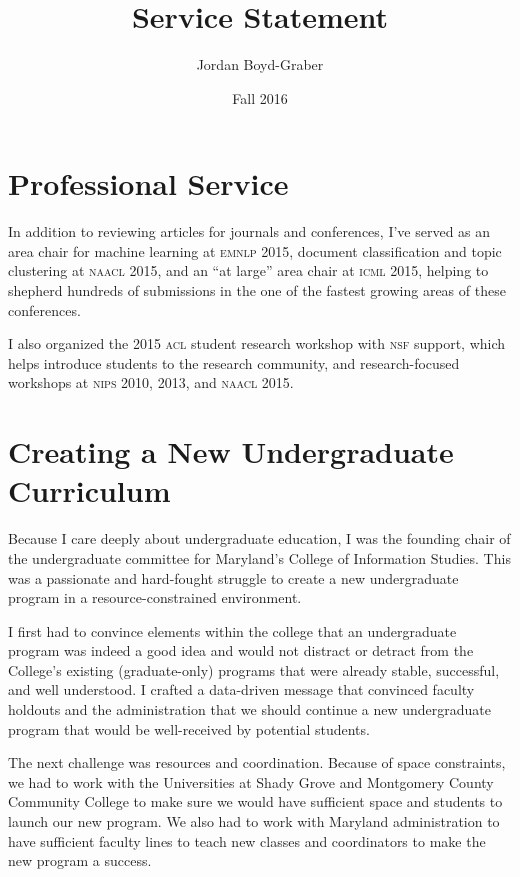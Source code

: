 \documentclass[11pt]{amsart}
\newcommand{\abr}[1]{\textsc{#1}}
\begin{document}
 \title{Service Statement}

 \author{Jordan Boyd-Graber}
\address{University of Colorado}

\date{Fall 2016}


\keywords{}

\maketitle

\section{Professional Service}

In addition to reviewing articles for journals and conferences, I've
served as an area chair for machine learning at \abr{emnlp} 2015,
document classification and topic clustering at \abr{naacl} 2015, and
an ``at large'' area chair at \abr{icml} 2015, helping to shepherd
hundreds of submissions in the one of the fastest growing areas of
these conferences.

I also organized the 2015 \abr{acl} student research workshop with
\abr{nsf} support, which helps introduce students to the research
community, and research-focused workshops at \abr{nips} 2010, 2013,
and \abr{naacl} 2015.

\section{Creating a New Undergraduate Curriculum}

Because I care deeply about undergraduate education, I was the founding chair of
the undergraduate committee for Maryland's College of Information Studies.  This was a
passionate and hard-fought struggle to create a new undergraduate program in a
resource-constrained environment.

I first had to convince elements within the college that an undergraduate
program was indeed a good idea and would not distract or detract from the
College's existing (graduate-only) programs that were already stable,
successful, and well understood.  I crafted a data-driven message that convinced
faculty holdouts and the administration that we should continue a new
undergraduate program that would be well-received by potential students.

The next challenge was resources and coordination.  Because of space constraints,
we had to work with the Universities at Shady Grove and Montgomery County
Community College to make sure we would have sufficient space and students to
launch our new program.  We also had to work with Maryland administration to
have sufficient faculty lines to teach new classes and coordinators to make the
new program a success.
\end{document}
